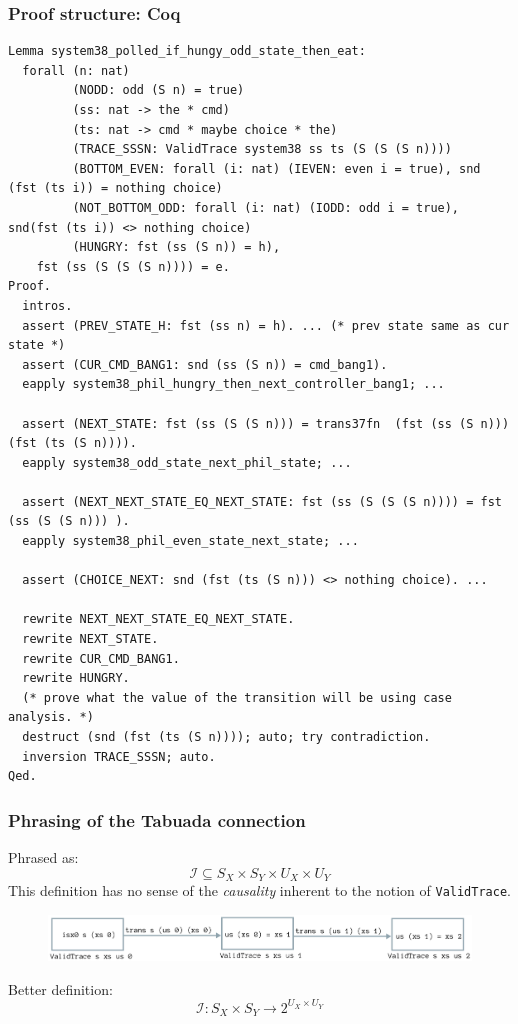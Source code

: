 \documentclass{beamer}
\begin{document}
\begin{frame}[fragile]
\frametitle{Proof structure: Coq}
{\tiny
\begin{verbatim}
Lemma system38_polled_if_hungy_odd_state_then_eat:
  forall (n: nat)
         (NODD: odd (S n) = true)
         (ss: nat -> the * cmd)
         (ts: nat -> cmd * maybe choice * the)
         (TRACE_SSSN: ValidTrace system38 ss ts (S (S (S n))))
         (BOTTOM_EVEN: forall (i: nat) (IEVEN: even i = true), snd (fst (ts i)) = nothing choice)
         (NOT_BOTTOM_ODD: forall (i: nat) (IODD: odd i = true),  snd(fst (ts i)) <> nothing choice)
         (HUNGRY: fst (ss (S n)) = h),
    fst (ss (S (S (S n)))) = e.
Proof.
  intros.
  assert (PREV_STATE_H: fst (ss n) = h). ... (* prev state same as cur state *)
  assert (CUR_CMD_BANG1: snd (ss (S n)) = cmd_bang1).
  eapply system38_phil_hungry_then_next_controller_bang1; ...

  assert (NEXT_STATE: fst (ss (S (S n))) = trans37fn  (fst (ss (S n))) (fst (ts (S n)))).
  eapply system38_odd_state_next_phil_state; ...

  assert (NEXT_NEXT_STATE_EQ_NEXT_STATE: fst (ss (S (S (S n)))) = fst (ss (S (S n))) ).
  eapply system38_phil_even_state_next_state; ...

  assert (CHOICE_NEXT: snd (fst (ts (S n))) <> nothing choice). ...
  
  rewrite NEXT_NEXT_STATE_EQ_NEXT_STATE.
  rewrite NEXT_STATE.
  rewrite CUR_CMD_BANG1.
  rewrite HUNGRY.
  (* prove what the value of the transition will be using case analysis. *)
  destruct (snd (fst (ts (S n)))); auto; try contradiction.
  inversion TRACE_SSSN; auto.
Qed.
\end{verbatim}
}
\end{frame}



\begin{frame}[fragile]
\frametitle{Phrasing of the Tabuada connection}

Phrased as: $$\mathcal{I} \subseteq S_X \times S_Y \times U_X \times U_Y$$
\pause
This definition has no sense of the \emph{causality} inherent to the notion
of \texttt{ValidTrace}.
\pause
\begin{figure}[H]
\includegraphics[width=\textwidth]{validtrace.png}
\end{figure}
\pause
Better definition:
$$\mathcal{I}: S_X \times S_Y \rightarrow  2^{U_X \times U_Y}$$

\end{frame}
\end{document}
